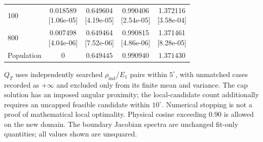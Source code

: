 \documentclass[12pt,letterpaper]{article}
\theoremstyle{plain}
\theoremstyle{definition}
\begin{document}
\begin{table}[p]
\begin{adjustbox}{max width=\linewidth}
\begin{tabular}{lcccc}
\midrule
100 & \shortstack{0.018589\\[-1pt]{\scriptsize[1.06e-05]}} & \shortstack{0.649604\\[-1pt]{\scriptsize[4.19e-05]}} & \shortstack{0.990406\\[-1pt]{\scriptsize[2.54e-05]}} & \shortstack{1.372116\\[-1pt]{\scriptsize[3.58e-04]}}\\
800 & \shortstack{0.007498\\[-1pt]{\scriptsize[4.04e-06]}} & \shortstack{0.649464\\[-1pt]{\scriptsize[7.52e-06]}} & \shortstack{0.990815\\[-1pt]{\scriptsize[4.86e-06]}} & \shortstack{1.371461\\[-1pt]{\scriptsize[8.28e-05]}}\\
Population & $0$ & $0.649445$ & $0.990940$ & $1.371430$\\
\bottomrule
\end{tabular}
\end{adjustbox}
\par\smallskip
\begin{minipage}{0.98\linewidth}\footnotesize
$Q_T$ uses independently searched $\rho_{\mathrm{ind}}$/$E_1$ pairs within $5^\circ$, with unmatched cases recorded as $+\infty$ and excluded only from its finite mean and variance. The cap solution has an imposed angular proximity; the local-candidate count additionally requires an uncapped feasible candidate within $10^\circ$. Numerical stopping is not a proof of mathematical local optimality. Physical cosine exceeding $0.90$ is allowed on the new domain. The boundary Jacobian spectra are unchanged fit-only quantities; all values shown are unsquared.
\end{minipage}
\endgroup
\end{table}
\clearpage
\end{document}
